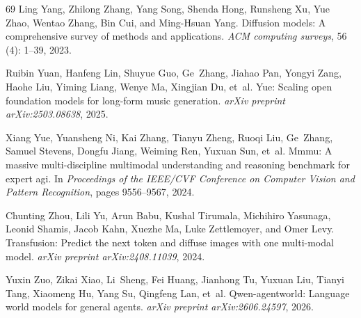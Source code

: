 \begin{thebibliography}{69}
Ling Yang, Zhilong Zhang, Yang Song, Shenda Hong, Runsheng Xu, Yue Zhao, Wentao Zhang, Bin Cui, and Ming-Hsuan Yang.
\newblock Diffusion models: A comprehensive survey of methods and applications.
\newblock \emph{ACM computing surveys}, 56 (4): 1--39, 2023.

Ruibin Yuan, Hanfeng Lin, Shuyue Guo, Ge~Zhang, Jiahao Pan, Yongyi Zang, Haohe Liu, Yiming Liang, Wenye Ma, Xingjian Du, et~al.
\newblock Yue: Scaling open foundation models for long-form music generation.
\newblock \emph{arXiv preprint arXiv:2503.08638}, 2025.

Xiang Yue, Yuansheng Ni, Kai Zhang, Tianyu Zheng, Ruoqi Liu, Ge~Zhang, Samuel Stevens, Dongfu Jiang, Weiming Ren, Yuxuan Sun, et~al.
\newblock Mmmu: A massive multi-discipline multimodal understanding and reasoning benchmark for expert agi.
\newblock In \emph{Proceedings of the IEEE/CVF Conference on Computer Vision and Pattern Recognition}, pages 9556--9567, 2024.

Chunting Zhou, Lili Yu, Arun Babu, Kushal Tirumala, Michihiro Yasunaga, Leonid Shamis, Jacob Kahn, Xuezhe Ma, Luke Zettlemoyer, and Omer Levy.
\newblock Transfusion: Predict the next token and diffuse images with one multi-modal model.
\newblock \emph{arXiv preprint arXiv:2408.11039}, 2024.

Yuxin Zuo, Zikai Xiao, Li~Sheng, Fei Huang, Jianhong Tu, Yuxuan Liu, Tianyi Tang, Xiaomeng Hu, Yang Su, Qingfeng Lan, et~al.
\newblock Qwen-agentworld: Language world models for general agents.
\newblock \emph{arXiv preprint arXiv:2606.24597}, 2026.

\end{thebibliography}
